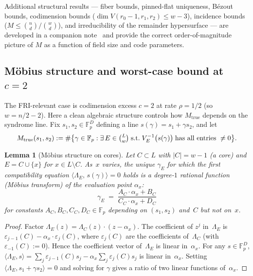 \documentclass[11pt]{article}
\newtheorem{lemma}[theorem]{Lemma}
\newcommand{\FF}{\mathbb{F}}
\begin{document}
Additional structural results --- fiber bounds, pinned-flat uniqueness, B\'ezout bounds, codimension bounds ($\dim V(r_0{-}1, r_1, r_2) \leq w{-}3$), incidence bounds ($M \leq \binom{n}{d}/\binom{w}{d}$), and irreducibility of the remainder hypersurface --- are developed in a companion note~\cite{Note0088} and provide the correct order-of-magnitude picture of $M$ as a function of field size and code parameters.

\subsection{M\"obius structure and worst-case bound at $c = 2$}
\label{sec:mobius}

The FRI-relevant case is codimension excess $c = 2$ at rate $\rho = 1/2$ (so $w = n/2 - 2$). Here a clean algebraic structure controls how $M_{\mathrm{true}}$ depends on the syndrome line. Fix $s_1, s_2 \in \FF_p^D$ defining a line $s(\gamma) = s_1 + \gamma s_2$, and let
\[
   M_{\mathrm{true}}(s_1, s_2) := \#\bigl\{\gamma \in \FF_p : \exists\, E \in \tbinom{L}{w}\;\text{s.t.}\; V_E^{-1}\bigl(s(\gamma)\bigr)\;\text{has all entries }\neq 0\bigr\}.
\]

\begin{lemma}[M\"obius structure on cores]
\label{lem:mobius}
Let $C \subset L$ with $|C| = w - 1$ (a \emph{core}) and $E = C \cup \{x\}$ for $x \in L \setminus C$. As~$x$ varies, the unique $\gamma_E$ for which the first compatibility equation $\langle \Lambda_E,\, s(\gamma) \rangle = 0$ holds is a degree-$1$ rational function (M\"obius transform) of the evaluation point $\alpha_x$:
\[
   \gamma_E \;=\; \frac{A_C \cdot \alpha_x + B_C}{C_C \cdot \alpha_x + D_C}
\]
for constants $A_C, B_C, C_C, D_C \in \FF_p$ depending on $(s_1, s_2)$ and~$C$ but not on~$x$.
\end{lemma}

\begin{proof}
Factor $\Lambda_E(z) = \Lambda_C(z) \cdot (z - \alpha_x)$. The coefficient of $z^j$ in~$\Lambda_E$ is $\varepsilon_{j-1}(C) - \alpha_x \cdot \varepsilon_j(C)$, where $\varepsilon_j(C)$ are the coefficients of~$\Lambda_C$ (with $\varepsilon_{-1}(C) := 0$). Hence the coefficient vector of~$\Lambda_E$ is linear in~$\alpha_x$. For any $s \in \FF_p^D$, $\langle \Lambda_E, s \rangle = \sum_j \varepsilon_{j-1}(C) s_j - \alpha_x \sum_j \varepsilon_j(C) s_j$ is linear in~$\alpha_x$. Setting $\langle \Lambda_E, s_1 + \gamma s_2 \rangle = 0$ and solving for $\gamma$ gives a ratio of two linear functions of~$\alpha_x$.
\end{proof}
\end{document}
